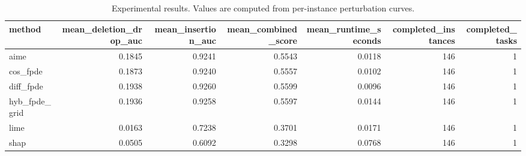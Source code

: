 \begin{table}[t]
\caption{Experimental results. Values are computed from per-instance perturbation curves.}
\label{tab:main_results_computed}
\centering
\begin{tabular}{lrrrrrr}
\toprule
method & mean\_deletion\_drop\_auc & mean\_insertion\_auc & mean\_combined\_score & mean\_runtime\_seconds & completed\_instances & completed\_tasks \\
\midrule
aime & 0.1845 & 0.9241 & 0.5543 & 0.0118 & 146 & 1 \\
cos\_fpde & 0.1873 & 0.9240 & 0.5557 & 0.0102 & 146 & 1 \\
diff\_fpde & 0.1938 & 0.9260 & 0.5599 & 0.0096 & 146 & 1 \\
hyb\_fpde\_grid & 0.1936 & 0.9258 & 0.5597 & 0.0144 & 146 & 1 \\
lime & 0.0163 & 0.7238 & 0.3701 & 0.0171 & 146 & 1 \\
shap & 0.0505 & 0.6092 & 0.3298 & 0.0768 & 146 & 1 \\
\bottomrule
\end{tabular}

\end{table}
